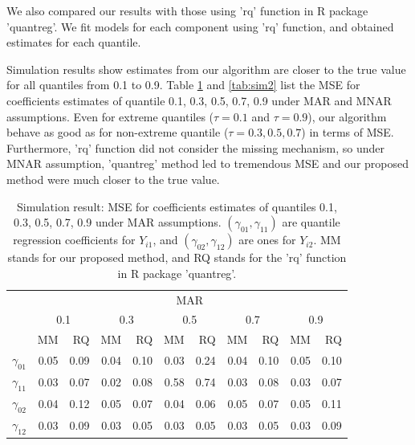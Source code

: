 \documentclass[12pt]{article}
\begin{document}
We also compared our results with those using 'rq' function in R
package 'quantreg'. We fit models for each component using 'rq'
function, and obtained estimates for each quantile.

Simulation results show estimates from our algorithm are closer to the
true value for all quantiles from 0.1 to 0.9. Table \ref{tab:sim} and
\ref{tab:sim2} list the MSE for coefficients estimates of quantile
0.1, 0.3, 0.5, 0.7, 0.9 under MAR and MNAR assumptions. Even for
extreme quantiles ($\tau = 0.1$ and $\tau = 0.9$), our algorithm
behave as good as for non-extreme quantile ($\tau = 0.3, 0.5, 0.7$) in
terms of MSE. Furthermore, 'rq' function did not consider the missing
mechanism, so under MNAR assumption, 'quantreg' method led to
tremendous MSE and our proposed method were much closer to the true
value.

\begin{table}
  \renewcommand{\arraystretch}{1.3}
  \centering
  \caption{Simulation result: MSE for coefficients estimates of quantiles
    0.1, 0.3, 0.5, 0.7, 0.9 under MAR assumptions. $(\gamma_{01}, \gamma_{11})$ 
    are quantile regression coefficients for $Y_{i1}$, and $(\gamma_{02}, \gamma_{12})$ 
    are ones for $Y_{i2}$. MM stands for our proposed method, and RQ stands for the 'rq' 
    function in R package 'quantreg'.}
  \vspace{10pt}
  \begin{tabular}{rrrrrrrrrrr}
    \toprule
    & \multicolumn{ 10}{c}{MAR} \\
    \cline{2-11}
    &  \multicolumn{2}{c}{0.1} &  \multicolumn{2}{c}{0.3} &  \multicolumn{2}{c}{0.5} &  \multicolumn{2}{c}{0.7} &  \multicolumn{2}{c}{0.9} \\
    \cline{2-11}
    & MM & RQ    & MM & RQ    & MM & RQ    & MM & RQ    & MM & RQ \\
    \hline
    $\gamma_{01}$ &  0.05 &0.09& 0.04  &0.10 &0.03 &0.24 &0.04 &0.10 &0.05 &0.10 \\
    $\gamma_{11}$ &  0.03 &0.07&  0.02 &0.08 &0.58 &0.74 &0.03 &0.08 &0.03 &0.07 \\ 
    $\gamma_{02}$ & 0.04  &0.12&  0.05 &0.07 &0.04 &0.06 &0.05 &0.07 &0.05 &0.11 \\ 
    $\gamma_{12}$ &  0.03 & 0.09& 0.03 &0.05 &0.03 &0.05 &0.03 &0.05 &0.03 &0.09 \\ 
    \bottomrule
  \end{tabular}  \label{tab:sim}
\end{table}
\end{document}
